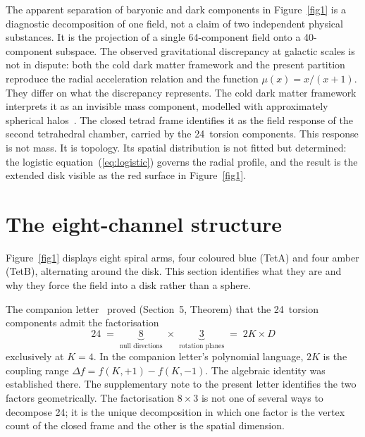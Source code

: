\documentclass[twocolumn]{iopjournal}
\begin{document}
The apparent separation of baryonic and dark components in
Figure~\ref{fig1} is a diagnostic decomposition of one field,
not a claim of two independent physical substances.  It is the
projection of a single 64-component field onto a 40-component
subspace.  The observed gravitational discrepancy at galactic
scales is not in dispute: both the cold dark matter framework
and the present partition reproduce the radial acceleration
relation and the function $\mu(x) = x/(x{+}1)$.  They differ
on what the discrepancy represents.  The cold dark matter
framework interprets it as an invisible mass component,
modelled with approximately spherical
halos~\cite{NFW1996}.  The closed tetrad frame identifies it as the field
response of the second tetrahedral chamber, carried by the
24~torsion components.  This response is not mass.  It is
topology.  Its spatial distribution is not fitted but
determined: the logistic equation~(\ref{eq:logistic}) governs
the radial profile, and the result is the extended disk
visible as the red surface in Figure~\ref{fig1}.


\section{The eight-channel structure}

Figure~\ref{fig1} displays eight spiral
arms, four coloured blue (TetA) and four amber (TetB),
alternating around the disk.  This section identifies what they
are and why they force the field into a disk rather than a
sphere.

The companion letter~\cite{Nelson2026b} proved (Section~5,
Theorem) that the 24~torsion components admit the
factorisation
\begin{equation}
  24 \;=\; \underbrace{8}_{\text{null directions}}
        \;\times\; \underbrace{3}_{\text{rotation planes}}
  \;=\; 2K \times D
  \label{eq:24}
\end{equation}
exclusively at $K = 4$.  In the companion letter's polynomial
language, $2K$ is the coupling range
$\Delta f = f(K,{+}1) - f(K,{-}1)$.  The algebraic identity
was established there.  The supplementary note to the present
letter identifies the two factors geometrically.  The
factorisation $8 \times 3$ is not one of several ways to
decompose 24; it is the unique decomposition in which one
factor is the vertex count of the closed frame and the other
is the spatial dimension.
\end{document}
